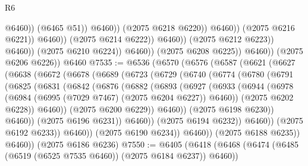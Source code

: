 \begin{lexlean}{R6}
\begin{coremodule}
                                                    @6460))
                                                (@6465 @51))
                                              @6460))
                                          (@2075 @6218 @6220))
                                        @6460))
                                    (@2075 @6216 @6221))
                                  @6460))
                              (@2075 @6214 @6222))
                            @6460))
                        (@2075 @6212 @6223))
                      @6460))
                  (@2075 @6210 @6224))
                @6460))
            (@2075 @6208 @6225))
          @6460))
      (@2075 @6206 @6226))
    @6460
@7535 := @6536
    (@6570
      (@6576
        (@6587
          (@6621
            (@6627
              (@6638
                (@6672
                  (@6678
                    (@6689
                      (@6723
                        (@6729
                          (@6740
                            (@6774
                              (@6780
                                (@6791
                                  (@6825
                                    (@6831
                                      (@6842
                                        (@6876
                                          (@6882
                                            (@6893
                                              (@6927
                                                (@6933
                                                  (@6944
                                                    (@6978
                                                      (@6984
                                                        (@6995 (@7029 @7467) (@2075 @6204 @6227))
                                                        @6460))
                                                    (@2075 @6202 @6228))
                                                  @6460))
                                              (@2075 @6200 @6229))
                                            @6460))
                                        (@2075 @6198 @6230))
                                      @6460))
                                  (@2075 @6196 @6231))
                                @6460))
                            (@2075 @6194 @6232))
                          @6460))
                      (@2075 @6192 @6233))
                    @6460))
                (@2075 @6190 @6234))
              @6460))
          (@2075 @6188 @6235))
        @6460))
    (@2075 @6186 @6236)
@7550 := @6405
    (@6418
      (@6468 (@6474 (@6485 (@6519 (@6525 @7535 @6460)) (@2075 @6184 @6237)) @6460))

\end{coremodule}
\end{lexlean}
